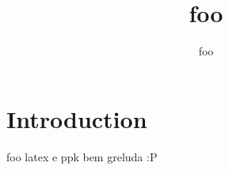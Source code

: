 \documentclass[]{scrreprt}
\author{foo}
\title{foo}
\date{}
\begin{document}
\maketitle
\printglossary[type=\acronymtype,title=Abbreviations]

\chapter{Introduction}
\label{cha:Introduction}

foo \gls{latex} e \gls{ppk} bem greluda :P
\end{document}
